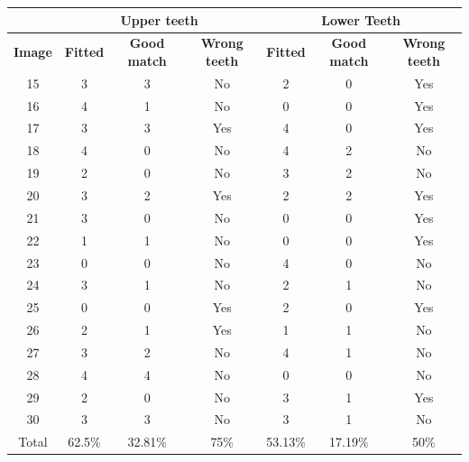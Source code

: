 \documentclass[a4paper,11pt,twoside]{article}
\begin{document}
\begin{table}[H]
\begin{center}
\begin{tabular}{|c| cc c| cc c |}
\cline{2-7}
 \multicolumn{1}{c}{}&  \multicolumn{3}{|c|}{Upper teeth} & \multicolumn{3}{c|}{Lower Teeth} \\ \hline
\textbf{Image} & \textbf{Fitted}  & \textbf{Good match} & \textbf{Wrong teeth} & \textbf{Fitted}   & \textbf{Good match} & \textbf{Wrong teeth}  \\ \hline
15 &  3 & 3 & No & 2 & 0 & Yes  \\
16 & 4  & 1 & No & 0 & 0 &Yes \\ 
17 & 3 & 3 & Yes & 4 & 0 & Yes  \\ 
18 & 4  & 0 & No & 4 & 2 & No \\  
19 & 2 & 0 &  No  & 3 & 2 & No \\ 
20 & 3 &  2 & Yes & 2 & 2 & Yes  \\ 
21 & 3 & 0 & No & 0 & 0 & Yes  \\ 
22 & 1 & 1 & No & 0 & 0 & Yes  \\ 
23 & 0 & 0 & No  & 4 & 0 & No \\ 
24 & 3 & 1 & No  & 2 & 1 & No \\ 
25 & 0 & 0 & Yes  & 2 & 0 & Yes \\ 
26 & 2 & 1 & Yes & 1 & 1 & No  \\ 
27 & 3 & 2 & No  & 4 & 1 & No \\ 
28 & 4 & 4 & No & 0 & 0 & No  \\ 
29 & 2 & 0 & No  & 3 & 1 & Yes \\ 
30 & 3 & 3 & No & 3 & 1 & No  \\ \hline 
Total & 62.5\% & 32.81\% &  75\% & 53.13\% & 17.19\% &  50\% \\
\hline
\end{tabular}
\label{table2}
\end{center}
\end{table}
\end{document}

